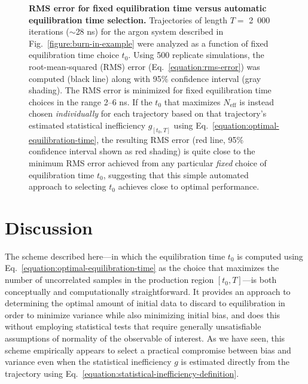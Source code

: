 \documentclass[aps,pre,twocolumn,nofootinbib,superscriptaddress,linenumbers,11point]{revtex4-1}
\begin{document}
\begin{figure}[tbp]
\caption{\label{figure:argon-rmse} {\bf RMS error for fixed equilibration time versus automatic equilibration time selection.} 
Trajectories of length $T = $ 2~000 iterations ($\sim$28 ns) for the argon system described in Fig.~\ref{figure:burn-in-example} were analyzed as a function of fixed equilibration time choice $t_0$.
Using 500 replicate simulations, the root-mean-squared (RMS) error (Eq.~\ref{equation:rms-error}) was computed (black line) along with 95\% confidence interval (gray shading).
The RMS error is minimized for fixed equilibration time choices in the range 2--6 ns.
If the $t_0$ that maximizes $N_\mathrm{eff}$ is instead chosen \emph{individually} for each trajectory based on that trajectory's estimated statistical inefficiency $g_{[t_0,T]}$ using Eq.~\ref{equation:optimal-equilibration-time}, the resulting RMS error (red line, 95\% confidence interval shown as red shading) is quite close to the minimum RMS error achieved from any particular \emph{fixed} choice of equilibration time $t_0$, suggesting that this simple automated approach to selecting $t_0$ achieves close to optimal performance.
}
\end{figure}


\section*{Discussion}
\label{section:discussion}

The scheme described here---in which the equilibration time $t_0$ is computed using Eq.~\ref{equation:optimal-equilibration-time} as the choice that maximizes the number of uncorrelated samples in the production region $[t_0,T]$---is both conceptually and computationally straightforward.
It provides an approach to determining the optimal amount of initial data to discard to equilibration in order to minimize variance while also minimizing initial bias, and does this without employing statistical tests that require generally unsatisfiable assumptions of normality of the observable of interest.
As we have seen, this scheme empirically appears to select a practical compromise between bias and variance even when the statistical inefficiency $g$ is estimated directly from the trajectory using Eq.~\ref{equation:statistical-inefficiency-definition}.
\end{document}
